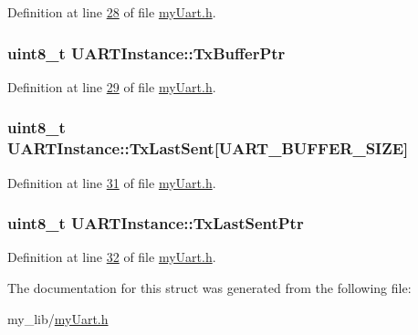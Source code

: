 Definition at line \hyperlink{my_uart_8h_source_l00028}{28} of file \hyperlink{my_uart_8h_source}{my\-Uart.\-h}.

\hypertarget{struct_u_a_r_t_instance_ada90140ddc0177a452e32c0a1268f0fe}{
\subsubsection[{Tx\-Buffer\-Ptr}]{\setlength{\rightskip}{0pt plus 5cm}uint8\-\_\-t U\-A\-R\-T\-Instance\-::\-Tx\-Buffer\-Ptr}}\label{struct_u_a_r_t_instance_ada90140ddc0177a452e32c0a1268f0fe}


Definition at line \hyperlink{my_uart_8h_source_l00029}{29} of file \hyperlink{my_uart_8h_source}{my\-Uart.\-h}.

\hypertarget{struct_u_a_r_t_instance_ac79c2c5b8bc7ae929e76b44e9b0d71a8}{
\subsubsection[{Tx\-Last\-Sent}]{\setlength{\rightskip}{0pt plus 5cm}uint8\-\_\-t U\-A\-R\-T\-Instance\-::\-Tx\-Last\-Sent\mbox{[}{\bf U\-A\-R\-T\-\_\-\-B\-U\-F\-F\-E\-R\-\_\-\-S\-I\-Z\-E}\mbox{]}}}\label{struct_u_a_r_t_instance_ac79c2c5b8bc7ae929e76b44e9b0d71a8}


Definition at line \hyperlink{my_uart_8h_source_l00031}{31} of file \hyperlink{my_uart_8h_source}{my\-Uart.\-h}.

\hypertarget{struct_u_a_r_t_instance_a61c194974dc7b5951c59543ecbf6c651}{
\subsubsection[{Tx\-Last\-Sent\-Ptr}]{\setlength{\rightskip}{0pt plus 5cm}uint8\-\_\-t U\-A\-R\-T\-Instance\-::\-Tx\-Last\-Sent\-Ptr}}\label{struct_u_a_r_t_instance_a61c194974dc7b5951c59543ecbf6c651}


Definition at line \hyperlink{my_uart_8h_source_l00032}{32} of file \hyperlink{my_uart_8h_source}{my\-Uart.\-h}.



The documentation for this struct was generated from the following file\-:\begin{DoxyCompactItemize}
\item 
my\-\_\-lib/\hyperlink{my_uart_8h}{my\-Uart.\-h}\end{DoxyCompactItemize}
